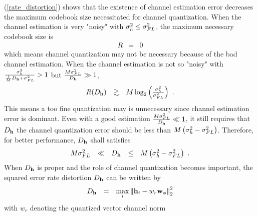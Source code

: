 \documentclass[10pt,fleqn, twocolumn]{IEEEtran}
\newcommand{\bh}{{\bf h}}
\newcommand{\bw}{{\bf w}}
\begin{document}
(\ref{rate_distortion}) shows that the existence of channel
estimation error decreases the maximum codebook size necessitated
for channel quantization. When the channel estimation is very
"noisy" with $\sigma_{h}^{2}\leq\sigma_{\mbox{\tiny FL}}^{2}$, the
maximum necessary codebook size is
\begin{equation}%
\begin{array}{rcl}
R&=&0
\end{array}
\end{equation}
\noindent which means channel quantization may not be necessary
because of the bad channel estimation. When the channel estimation
is not so "noisy" with
$\frac{\sigma_{h}^{2}}{\frac{1}{M}D_{\bh}+\sigma_{\mbox{\tiny
FL}}^{2}}>1$   but $\frac{M\sigma_{\mbox{\tiny
FL}}^{2}}{D_{\bh}}\gg 1$,
\begin{equation}%
\begin{array}{rcl}
R(D_{\bh})&\gtrsim&M\log_{2}\left(\frac{\sigma_{h}^{2}}{\sigma_{\mbox{\tiny
FL}}^{2}}\right)\ .
\end{array}
\end{equation}
\noindent This means a too fine quantization may is unnecessary
since channel estimation error is dominant. Even with a good
estimation $\frac{M\sigma_{\mbox{\tiny FL}}^{2}}{D_{\bh}}\ll 1$,
it still requires that $D_{\bh}$ the channel quantization error
should be less than $M\left(\sigma_{h}^{2}-\sigma_{\mbox{\tiny
FL}}^{2}\right)$. Therefore, for better performance, $D_{\bh}$
shall satisfies
\begin{equation}%
\begin{array}{rcccl}
M\sigma_{\mbox{\tiny
FL}}^{2}&\ll&D_{\bh}&\leq&M\left(\sigma_{h}^{2}-\sigma_{\mbox{\tiny
FL}}^{2}\right)\ .
\end{array}
\end{equation}
\noindent When $D_{\bh}$ is proper and the role of channel
quantization becomes important, the squared error rate distortion
$D_{\bh}$ can be written by
\begin{equation}%
\begin{array}{rcl}
D_{\bh}&=&\max\limits_{i}\left\|\bh_{i}-w_{r}{\bw}_{\phi}\right\|_{2}^{2}
\end{array}\label{D_h}
\end{equation}
\noindent with $w_{r}$ denoting the quantized vector channel norm
\end{document}
